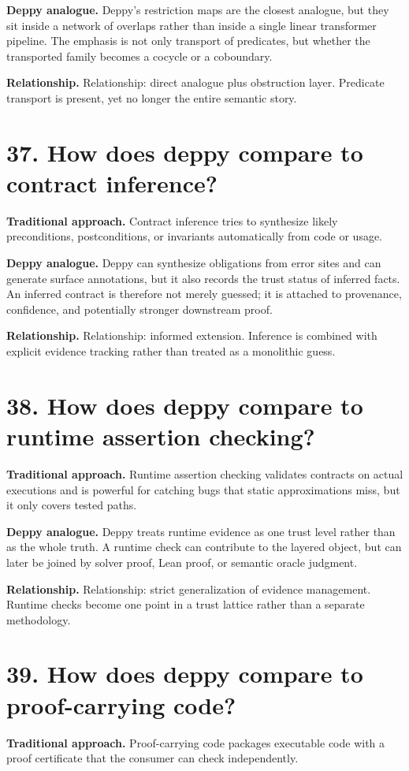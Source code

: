 \documentclass[11pt,openany]{book}
\begin{document}
\textbf{Deppy analogue.} Deppy's restriction maps are the closest analogue, but they sit inside a network of overlaps rather than inside a single linear transformer pipeline. The emphasis is not only transport of predicates, but whether the transported family becomes a cocycle or a coboundary.

\textbf{Relationship.} Relationship: direct analogue plus obstruction layer. Predicate transport is present, yet no longer the entire semantic story.

\section*{37. How does deppy compare to contract inference?}
\textbf{Traditional approach.} Contract inference tries to synthesize likely preconditions, postconditions, or invariants automatically from code or usage.

\textbf{Deppy analogue.} Deppy can synthesize obligations from error sites and can generate surface annotations, but it also records the trust status of inferred facts. An inferred contract is therefore not merely guessed; it is attached to provenance, confidence, and potentially stronger downstream proof.

\textbf{Relationship.} Relationship: informed extension. Inference is combined with explicit evidence tracking rather than treated as a monolithic guess.

\section*{38. How does deppy compare to runtime assertion checking?}
\textbf{Traditional approach.} Runtime assertion checking validates contracts on actual executions and is powerful for catching bugs that static approximations miss, but it only covers tested paths.

\textbf{Deppy analogue.} Deppy treats runtime evidence as one trust level rather than as the whole truth. A runtime check can contribute to the layered object, but can later be joined by solver proof, Lean proof, or semantic oracle judgment.

\textbf{Relationship.} Relationship: strict generalization of evidence management. Runtime checks become one point in a trust lattice rather than a separate methodology.

\section*{39. How does deppy compare to proof-carrying code?}
\textbf{Traditional approach.} Proof-carrying code packages executable code with a proof certificate that the consumer can check independently.
\end{document}
